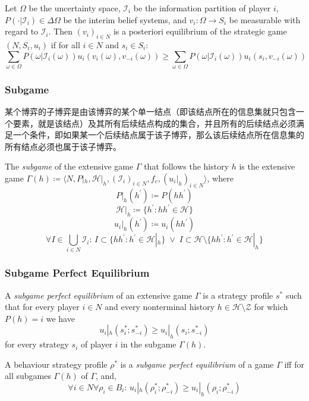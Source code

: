 \documentclass[UTF8,11pt,colorlinks,compress,openany]{beamer}%
\begin{document}
\begin{frame}\frametitle{}
Let $\Omega$ be the uncertainty space, $\mathcal{I}_i$ be the information partition of player $i$, $P(\cdot|\mathcal{I}_i)\in\Delta\Omega$ be the interim belief systems, and $v_i: \Omega \to S_i$ be measurable with regard to $\mathcal{I}_i$. Then $(v_i)_{i\in N}$ is a posteriori equilibrium of the strategic game $(N,S_i,u_i)$ if for all $i\in N$ and $s_i\in S_i$:
\[\sum_{\omega \in \Omega}P(\omega|\mathcal{I}_i(\omega))u_i(v_i(\omega ),v_{-i}(\omega))\geq\sum_{\omega \in \Omega}P(\omega|\mathcal{I}_i(\omega))u_i\left(s_i,v_{-i}(\omega)\right)\]
\end{frame}

\begin{frame}\frametitle{Subgame}
某个博弈的子博弈是由该博弈的某个单一结点（即该结点所在的信息集就只包含一个要素，就是该结点）及其所有后续结点构成的集合，并且所有的后续结点必须满足一个条件，即如果某一个后续结点属于该子博弈，那么该后续结点所在信息集的所有结点必须也属于该子博弈。
\begin{definition}[Subgame]
	The \emph{subgame} of the extensive game $\Gamma$ that follows the history $h$
	is the extensive game $\Gamma(h)\coloneqq \langle N,P|_h,\mathcal{H}|_h,(\mathcal{I}_i)_{i\in N},f_c,(u_i|_h)_{i\in N}\rangle$, where
	\[P|_h(h^\prime)\coloneqq P(hh^\prime)\]
	\[\mathcal{H}|_h\coloneqq \{h^\prime:hh^\prime\in\mathcal{H}\}\]
	\[u_i|_h(h^\prime)\coloneqq u_i(hh^\prime)\]
	\[\forall I\in\bigcup\limits_{i\in N}\mathcal{I}_i:\,I\subset\{hh^\prime:h^\prime\in\mathcal{H}|_h\}\;\vee\;I\subset\mathcal{H}\setminus \{hh^\prime:h^\prime\in\mathcal{H}|_h\}\]
\end{definition}	
\end{frame}

\begin{frame}\frametitle{Subgame Perfect Equilibrium}
\begin{definition}
	A \emph{subgame perfect equilibrium} of an extensive game $\Gamma$ is a strategy profile $s^*$ such that for every player $i\in N$ and every nonterminal history $h\in\mathcal{H}\setminus\mathcal{Z}$ for which $P(h)=i$ we have \[u_i|_h(s_i^*;s_{-i}^*)\geq u_i|_h(s_i;s_{-i}^*)\]
	for every strategy $s_i$ of player $i$ in the subgame $\Gamma(h)$.
	
	A behaviour strategy profile $\rho^*$ is a \emph{subgame perfect equilibrium} of a game $\Gamma$ iff for all subgames $\Gamma(h)$ of $\Gamma$, and,
	\[\forall i\in N\forall\rho_i\in B_i:\, u_i|_h(\rho_i^*;\rho_{-i}^*)\geq u_i|_h(\rho_i;\rho_{-i}^*)\]
\end{definition}
\end{frame}
\end{document}
